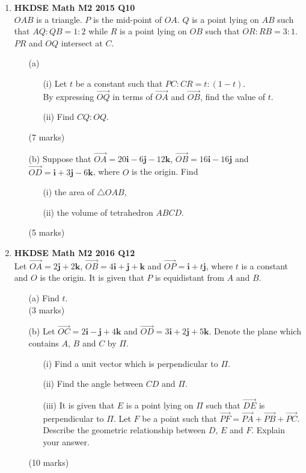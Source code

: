 \documentclass{report}
\begin{document}
\begin{enumerate}
	\item \textbf{HKDSE Math M2 2015 Q10}\\
	$OAB$ is a triangle. $P$ is the mid-point of $OA$. $Q$ is a point lying on $AB$ such that $AQ : QB = 1 : 2$ while $R$ is a point lying on $OB$ such that $OR : RB = 3:1$. $PR$ and $OQ$ intersect at $C$. 
	\begin{enumerate}
		\item [(a)]		
		\begin{enumerate}
			\item [(i)]Let $t$ be a constant such that $PC : CR = t : (1-t)$.\\
				By expressing $\overrightarrow{OQ}$ in terms of $\overrightarrow{OA}$ and $\overrightarrow{OB}$, find the value of $t$. 
			\item [(ii)]Find $CQ:OQ$. 
		\end{enumerate}
		(7 marks)
		\item [(b)]Suppose that $\overrightarrow{OA} = 20\textbf{i} -6 \textbf{j} -12\textbf {k}$, $\overrightarrow{OB} = 16\textbf{i} -16 \textbf{j}$ and $\overrightarrow{OD} = \textbf{i} +3 \textbf{j} -6\textbf {k}$, where $O$ is the origin. Find
		\begin{enumerate}
			\item [(i)]the area of $\triangle OAB$, 
			\item [(ii)]the volume of tetrahedron $ABCD$.
		\end{enumerate}
		(5 marks)
	\end{enumerate}
	
	\newpage

	\item \textbf{HKDSE Math M2 2016 Q12}\\
	Let $\overrightarrow{OA} = 2 \textbf{j} +2\textbf {k}$, 
		$\overrightarrow{OB} = 4\textbf{i} + \textbf{j} + \textbf {k}$ and 
		$\overrightarrow{OP} = \textbf{i} +t \textbf{j}$, where $t$ is a constant and $O$ is the origin. It is given that $P$ is equidistant from $A$ and $B$. 
	\begin{enumerate}
		\item [(a)]Find $t$.\\(3 marks)
		\item [(b)]Let $\overrightarrow{OC} = 2 \textbf{i} - \textbf{j} +4\textbf {k}$ and $\overrightarrow{OD} = 3 \textbf{i} +2 \textbf{j} +5\textbf {k}$. Denote the plane which contains $A$, $B$ and $C$ by $\Pi$.
		\begin{enumerate}
			\item [(i)]Find a unit vector which is perpendicular to $\Pi$. 
			\item [(ii)]Find the angle between $CD$ and  $\Pi$. 
			\item [(iii)]It is given that $E$ is a point lying on $\Pi$ such that 
			$\overrightarrow{DE}$ is perpendicular to $\Pi$. Let $F$ be a point such that $\overrightarrow{PF} = \overrightarrow{PA} + \overrightarrow{PB} + \overrightarrow{PC}$. Describe the geometric relationship between $D$, $E$ and $F$. Explain your answer.
		\end{enumerate}
		(10 marks)
	\end{enumerate}


\end{enumerate}
\end{document}
